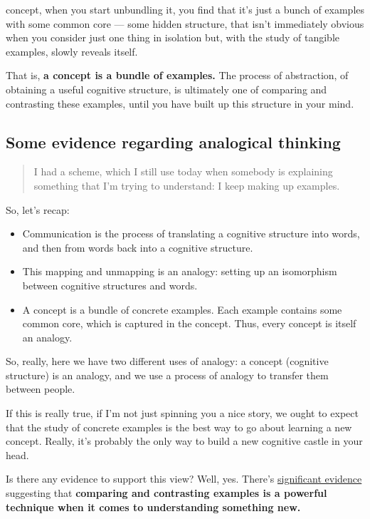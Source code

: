  concept, when you start unbundling
it, you find that it's just a bunch of examples with some common
core --- some hidden structure, that isn't immediately obvious when you
consider just one thing in isolation but, with the study of tangible examples,
slowly reveals itself.

That is, \textbf{a concept is a bundle of examples.} The process of
abstraction, of obtaining a useful cognitive structure, is ultimately
one of comparing and contrasting these examples, until you have built up
this structure in your mind.

\subsection{Some evidence regarding analogical
  thinking}\label{some-evidence-regarding-analogical-thinking}

\begin{quote}
I had a scheme, which I still use today when somebody is explaining something
that I'm trying to understand: I keep making up examples.
\end{quote}

So, let's recap:

\begin{itemize}
\itemsep1pt\parskip0pt
\item
  Communication is the process of translating a cognitive structure into
  words, and then from words back into a cognitive structure.
\item
  This mapping and unmapping is an analogy: setting up an isomorphism
  between cognitive structures and words.
\item
  A concept is a bundle of concrete examples. Each example contains some
  common core, which is captured in the concept. Thus, every concept is
  itself an analogy.
\end{itemize}

So, really, here we have two different uses of analogy: a
concept (cognitive structure) is an analogy, and we use a process of
analogy to transfer them between people.

If this is really true, if I'm not just spinning you a nice story, we
ought to expect that the study of concrete examples is the best way to
go about learning a new concept. Really, it's probably the only way to
build a new cognitive castle in your head.

Is there any evidence to support this view? Well, yes. There's
\href{http://psycnet.apa.org/journals/edu/95/2/393/}{significant
evidence} suggesting that \textbf{comparing and contrasting examples is
a powerful technique when it comes to understanding something new.}

